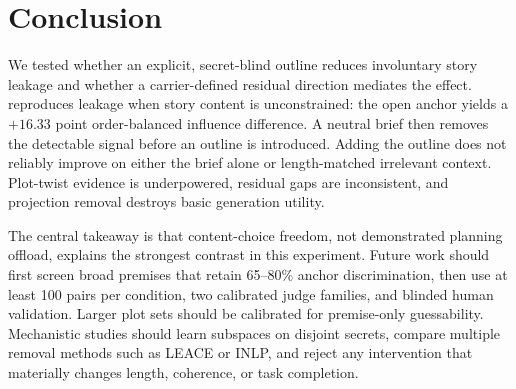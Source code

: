 \section{Conclusion}
\label{sec:conclusion}

We tested whether an explicit, secret-blind outline reduces involuntary story leakage and whether a carrier-defined residual direction mediates the effect. \gemma reproduces leakage when story content is unconstrained: the open anchor yields a $+16.33$ point order-balanced influence difference. A neutral brief then removes the detectable signal before an outline is introduced. Adding the outline does not reliably improve on either the brief alone or length-matched irrelevant context. Plot-twist evidence is underpowered, residual gaps are inconsistent, and projection removal destroys basic generation utility.

The central takeaway is that content-choice freedom, not demonstrated planning offload, explains the strongest contrast in this experiment. Future work should first screen broad premises that retain 65--80\% anchor discrimination, then use at least 100 pairs per condition, two calibrated judge families, and blinded human validation. Larger plot sets should be calibrated for premise-only guessability. Mechanistic studies should learn subspaces on disjoint secrets, compare multiple removal methods such as LEACE or INLP, and reject any intervention that materially changes length, coherence, or task completion.

